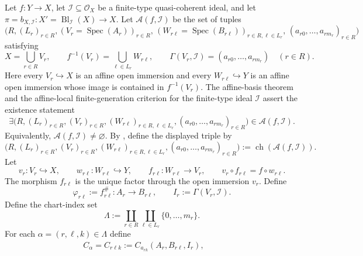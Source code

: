 \begin{definition}
  \label{def:nagata-strict-transform-closed-chart-model}
  \lean{}

  Let $f\colon Y\to X$, let
  $\mathcal I\subseteq\mathcal O_X$ be a finite-type quasi-coherent ideal,
  and let
  $\pi=b_{X,\mathcal I}\colon X'=\operatorname{Bl}_{\mathcal I}(X)\to X$.
  Let $\mathscr A(f,\mathcal I)$ be the set of tuples
  \[
    \bigl(R,(L_r)_{r\in R},
          (V_r=\operatorname{Spec}(A_r))_{r\in R},\,
          (W_{r\ell}=\operatorname{Spec}(B_{r\ell}))_
            {r\in R,\ell\in L_r},\,
          (a_{r0},\ldots,a_{rm_r})_{r\in R}\bigr)
  \]
  satisfying
  \[
    X=\bigcup_{r\in R}V_r,\qquad
    f^{-1}(V_r)=\bigcup_{\ell\in L_r}W_{r\ell},\qquad
    \Gamma(V_r,\mathcal I)=(a_{r0},\ldots,a_{rm_r})
      \quad(r\in R).
  \]
  Here every $V_r\hookrightarrow X$ is an affine open immersion and every
  $W_{r\ell}\hookrightarrow Y$ is an affine open immersion whose image is
  contained in $f^{-1}(V_r)$.
  The affine-basis theorem and the affine-local finite-generation criterion
  for the finite-type ideal $\mathcal I$ assert the existence statement
  \[
    \exists\bigl(R,(L_r)_{r\in R},(V_r)_{r\in R},
      (W_{r\ell})_{r\in R,\ell\in L_r},
      (a_{r0},\ldots,a_{rm_r})_{r\in R}\bigr)
      \in\mathscr A(f,\mathcal I).
  \]
  Equivalently,
  $\mathscr A(f,\mathcal I)\ne\varnothing$.  By
  , define the displayed triple by
  \[
    \bigl(R,(L_r)_{r\in R},(V_r)_{r\in R},
      (W_{r\ell})_{r\in R,\ell\in L_r},
      (a_{r0},\ldots,a_{rm_r})_{r\in R}\bigr)
      :=\operatorname{ch}(\mathscr A(f,\mathcal I)).
  \]
  Let
  \[
    v_r\colon V_r\hookrightarrow X,\qquad
    w_{r\ell}\colon W_{r\ell}\hookrightarrow Y,\qquad
    f_{r\ell}\colon W_{r\ell}\longrightarrow V_r,
    \qquad
    v_r\circ f_{r\ell}=f\circ w_{r\ell}.
  \]
  The morphism $f_{r\ell}$ is the unique factor through the open immersion
  $v_r$.  Define
  \[
    \varphi_{r\ell}:=f_{r\ell}^{\#}\colon A_r\to B_{r\ell},
    \qquad I_r:=\Gamma(V_r,\mathcal I).
  \]
  Define the chart-index set
  \[
    \Lambda:=\coprod_{r\in R}\coprod_{\ell\in L_r}
      \{0,\ldots,m_r\}.
  \]
  For each $\alpha=(r,\ell,k)\in\Lambda$ define
  \[
  \begin{gathered}
    C_\alpha=C_{r\ell k}:=C_{a_{rk}}(A_r,B_{r\ell},I_r),\qquad

\end{gathered}\]
\end{definition}
